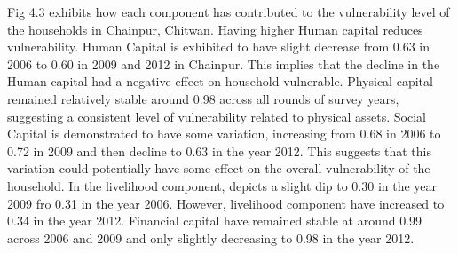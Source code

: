\documentclass[12pt, a4paper]{article}
\begin{document}
\vspace{-25pt}
 Fig 4.3 exhibits how each component has contributed to the vulnerability level of the households in Chainpur, Chitwan. Having higher Human capital reduces vulnerability. Human Capital is exhibited to have slight decrease from 0.63 in 2006 to 0.60 in 2009 and 2012 in Chainpur. This implies that the decline in the Human capital had a negative effect on household vulnerable. Physical capital remained relatively stable around 0.98 across all rounds of survey years, suggesting a consistent level of vulnerability related to physical assets. Social Capital is demonstrated to have some variation, increasing from 0.68 in 2006 to 0.72 in 2009 and then decline to 0.63 in the year 2012. This suggests that this variation could potentially have some effect on the overall vulnerability of the household. In the livelihood component, depicts a slight dip to 0.30 in the year 2009 fro 0.31 in the year 2006. However, livelihood component have increased to 0.34 in the year 2012. Financial capital have remained stable at around 0.99 across 2006 and 2009 and only slightly decreasing to 0.98 in the year 2012. 
   
\end{document}
